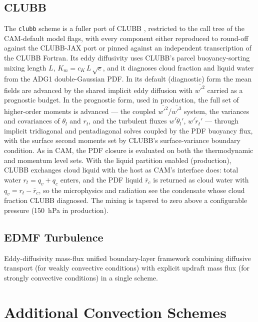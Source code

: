 \documentclass[11pt,twoside]{report}
\begin{document}
\subsection{CLUBB}
\label{sec:clubb}
The \texttt{clubb} scheme is a fuller port of CLUBB \citep{Golaz2002},
restricted to the call tree of the CAM-default model flags, with every
component either reproduced to round-off against the CLUBB-JAX port or pinned
against an independent transcription of the CLUBB Fortran.  Its eddy
diffusivity uses CLUBB's parcel buoyancy-sorting mixing length $L$,
$K_m=c_K\,L\,\sqrt{e}$, and it diagnoses cloud fraction and liquid water from
the ADG1 double-Gaussian PDF.  In its default (diagnostic) form the mean fields
are advanced by the shared implicit eddy diffusion with $\overline{w'^2}$
carried as a prognostic budget.  In the prognostic form, used in production,
the full set of higher-order moments is advanced --- the coupled
$\overline{w'^2}$/$\overline{w'^3}$ system, the variances and covariances of
$\theta_l$ and $r_t$, and the turbulent fluxes
$\overline{w'\theta_l'}$, $\overline{w'r_t'}$ --- through implicit tridiagonal
and pentadiagonal solves coupled by the PDF buoyancy flux, with the surface
second moments set by CLUBB's surface-variance boundary condition.  As in CAM,
the PDF closure is evaluated on both the thermodynamic and momentum level sets.
With the liquid partition enabled (production), CLUBB exchanges cloud liquid
with the host as CAM's interface does: total water $r_t=q_v+q_c$ enters, and
the PDF liquid $\bar r_c$ is returned as cloud water with $q_v=r_t-\bar r_c$,
so the microphysics and radiation see the condensate whose cloud fraction
CLUBB diagnosed.  The mixing is tapered to zero above a configurable pressure
(150~hPa in production).

\subsection{EDMF Turbulence}
Eddy-diffusivity mass-flux unified boundary-layer framework combining
diffusive transport (for weakly convective conditions) with explicit
updraft mass flux (for strongly convective conditions) in a single scheme.

\section{Additional Convection Schemes}
\label{sec:conv-additional}
\end{document}
